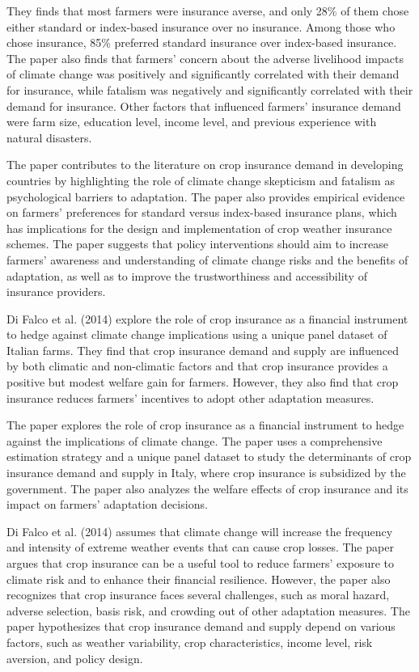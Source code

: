 \documentclass[a4paper,12pt]{article}
\begin{document}
They finds that most farmers were insurance averse, and only 28\% of them chose either standard or index-based insurance over no insurance. Among those who chose insurance, 85\% preferred standard insurance over index-based insurance. The paper also finds that farmers’ concern about the adverse livelihood impacts of climate change was positively and significantly correlated with their demand for insurance, while fatalism was negatively and significantly correlated with their demand for insurance. Other factors that influenced farmers’ insurance demand were farm size, education level, income level, and previous experience with natural disasters.

The paper contributes to the literature on crop insurance demand in developing countries by highlighting the role of climate change skepticism and fatalism as psychological barriers to adaptation. The paper also provides empirical evidence on farmers’ preferences for standard versus index-based insurance plans, which has implications for the design and implementation of crop weather insurance schemes. The paper suggests that policy interventions should aim to increase farmers’ awareness and understanding of climate change risks and the benefits of adaptation, as well as to improve the trustworthiness and accessibility of insurance providers.

Di Falco et al. (2014) explore the role of crop insurance as a financial instrument to hedge against climate change implications using a unique panel dataset of Italian farms. They find that crop insurance demand and supply are influenced by both climatic and non-climatic factors and that crop insurance provides a positive but modest welfare gain for farmers. However, they also find that crop insurance reduces farmers’ incentives to adopt other adaptation measures.

The paper explores the role of crop insurance as a financial instrument to hedge against the implications of climate change. The paper uses a comprehensive estimation strategy and a unique panel dataset to study the determinants of crop insurance demand and supply in Italy, where crop insurance is subsidized by the government. The paper also analyzes the welfare effects of crop insurance and its impact on farmers’ adaptation decisions.

Di Falco et al. (2014) assumes that climate change will increase the frequency and intensity of extreme weather events that can cause crop losses. The paper argues that crop insurance can be a useful tool to reduce farmers’ exposure to climate risk and to enhance their financial resilience. However, the paper also recognizes that crop insurance faces several challenges, such as moral hazard, adverse selection, basis risk, and crowding out of other adaptation measures. The paper hypothesizes that crop insurance demand and supply depend on various factors, such as weather variability, crop characteristics, income level, risk aversion, and policy design.
\end{document}
